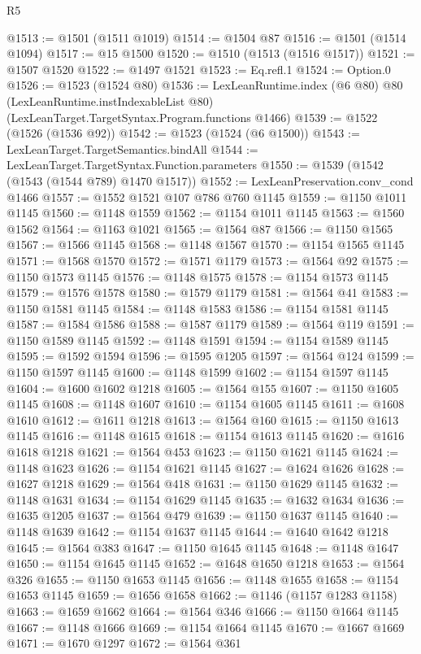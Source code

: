 \begin{lexlean}{R5}
\begin{coremodule}
@1513 := @1501 (@1511 @1019)
@1514 := @1504 @87
@1516 := @1501 (@1514 @1094)
@1517 := @15 @1500
@1520 := @1510 (@1513 (@1516 @1517))
@1521 := @1507 @1520
@1522 := @1497 @1521
@1523 := Eq.refl.{1}
@1524 := Option.{0}
@1526 := @1523 (@1524 @80)
@1536 := LexLeanRuntime.index
    (@6 @80)
    @80
    (LexLeanRuntime.instIndexableList @80)
    (LexLeanTarget.TargetSyntax.Program.functions @1466)
@1539 := @1522 (@1526 (@1536 @92))
@1542 := @1523 (@1524 (@6 @1500))
@1543 := LexLeanTarget.TargetSemantics.bindAll
@1544 := LexLeanTarget.TargetSyntax.Function.parameters
@1550 := @1539 (@1542 (@1543 (@1544 @789) @1470 @1517))
@1552 := LexLeanPreservation.conv_cond @1466
@1557 := @1552 @1521 @107 @786 @760 @1145
@1559 := @1150 @1011 @1145
@1560 := @1148 @1559
@1562 := @1154 @1011 @1145
@1563 := @1560 @1562
@1564 := @1163 @1021
@1565 := @1564 @87
@1566 := @1150 @1565
@1567 := @1566 @1145
@1568 := @1148 @1567
@1570 := @1154 @1565 @1145
@1571 := @1568 @1570
@1572 := @1571 @1179
@1573 := @1564 @92
@1575 := @1150 @1573 @1145
@1576 := @1148 @1575
@1578 := @1154 @1573 @1145
@1579 := @1576 @1578
@1580 := @1579 @1179
@1581 := @1564 @41
@1583 := @1150 @1581 @1145
@1584 := @1148 @1583
@1586 := @1154 @1581 @1145
@1587 := @1584 @1586
@1588 := @1587 @1179
@1589 := @1564 @119
@1591 := @1150 @1589 @1145
@1592 := @1148 @1591
@1594 := @1154 @1589 @1145
@1595 := @1592 @1594
@1596 := @1595 @1205
@1597 := @1564 @124
@1599 := @1150 @1597 @1145
@1600 := @1148 @1599
@1602 := @1154 @1597 @1145
@1604 := @1600 @1602 @1218
@1605 := @1564 @155
@1607 := @1150 @1605 @1145
@1608 := @1148 @1607
@1610 := @1154 @1605 @1145
@1611 := @1608 @1610
@1612 := @1611 @1218
@1613 := @1564 @160
@1615 := @1150 @1613 @1145
@1616 := @1148 @1615
@1618 := @1154 @1613 @1145
@1620 := @1616 @1618 @1218
@1621 := @1564 @453
@1623 := @1150 @1621 @1145
@1624 := @1148 @1623
@1626 := @1154 @1621 @1145
@1627 := @1624 @1626
@1628 := @1627 @1218
@1629 := @1564 @418
@1631 := @1150 @1629 @1145
@1632 := @1148 @1631
@1634 := @1154 @1629 @1145
@1635 := @1632 @1634
@1636 := @1635 @1205
@1637 := @1564 @479
@1639 := @1150 @1637 @1145
@1640 := @1148 @1639
@1642 := @1154 @1637 @1145
@1644 := @1640 @1642 @1218
@1645 := @1564 @383
@1647 := @1150 @1645 @1145
@1648 := @1148 @1647
@1650 := @1154 @1645 @1145
@1652 := @1648 @1650 @1218
@1653 := @1564 @326
@1655 := @1150 @1653 @1145
@1656 := @1148 @1655
@1658 := @1154 @1653 @1145
@1659 := @1656 @1658
@1662 := @1146 (@1157 @1283 @1158)
@1663 := @1659 @1662
@1664 := @1564 @346
@1666 := @1150 @1664 @1145
@1667 := @1148 @1666
@1669 := @1154 @1664 @1145
@1670 := @1667 @1669
@1671 := @1670 @1297
@1672 := @1564 @361

\end{coremodule}
\end{lexlean}
